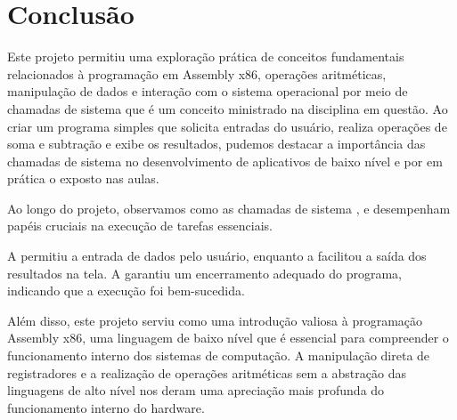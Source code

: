 \documentclass[
	12pt,				%
	openright,			%
	oneside,			%
	a4paper,			%
	chapter=TITLE,		%
	english,			%
	french,				%
	spanish,			%
	brazil				%
	]{abntex2}
\theoremstyle{definition}
\begin{document}
\chapter{Conclusão}
\label{conclusao}


Este projeto permitiu uma exploração prática de conceitos fundamentais relacionados 
à programação em Assembly x86, operações 
aritméticas, manipulação de dados e interação com o sistema operacional por meio de 
chamadas de sistema que é um conceito ministrado na disciplina em questão. 
Ao criar um programa simples que solicita
entradas do usuário, realiza operações de soma e subtração e exibe os resultados, 
pudemos destacar a importância das chamadas de sistema no 
desenvolvimento de aplicativos de baixo nível e por em prática o exposto nas aulas.

Ao longo do projeto, observamos como as chamadas de sistema 
, e 
desempenham papéis cruciais na execução de tarefas essenciais.
 
A  permitiu a entrada de dados pelo usuário, enquanto a  
facilitou a saída dos resultados na tela. A  garantiu um encerramento 
adequado do programa, indicando que a execução foi bem-sucedida.

Além disso, este projeto serviu como uma introdução valiosa à programação Assembly x86, uma 
linguagem de baixo nível que é essencial para compreender o funcionamento interno dos sistemas de 
computação. A manipulação direta de registradores e a realização de operações aritméticas sem a 
abstração das linguagens de alto nível nos deram uma apreciação mais profunda do 
funcionamento interno do hardware.


\postextual



\cite{tanenbaum2010sistemas}
\end{document}
